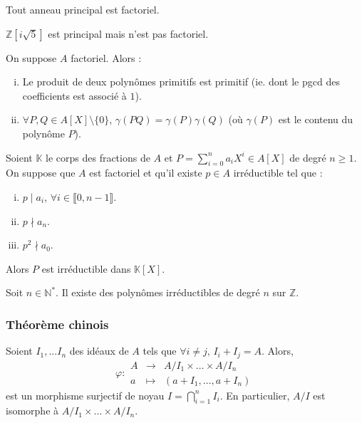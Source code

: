 	\begin{theorem}
		\label{122-4}
		Tout anneau principal est factoriel.
	\end{theorem}

	\begin{cexample}
		$\mathbb{Z}[i\sqrt{5}]$ est principal mais n'est pas factoriel.
	\end{cexample}
	
	
	\begin{lemma}[Gauss]
		On suppose $A$ factoriel. Alors :
		\begin{enumerate}[(i)]
			\item Le produit de deux polynômes primitifs est primitif (ie. dont le pgcd des coefficients est associé à $1$).
			\item $\forall P, Q \in A[X] \setminus \{ 0 \}$, $\gamma(PQ) = \gamma(P) \gamma(Q)$ (où $\gamma(P)$ est le contenu du polynôme $P$).
		\end{enumerate}
	\end{lemma}
	
	\begin{theorem}
		Soient $\mathbb{K}$ le corps des fractions de $A$ et $P = \sum_{i=0}^n a_i X^i \in A[X]$ de degré $n \geq 1$. On suppose que $A$ est factoriel et qu'il existe $p \in A$ irréductible tel que :
		\begin{enumerate}[(i)]
			\item $p \mid a_i$, $\forall i \in \llbracket 0, n-1 \rrbracket$.
			\item $p \nmid a_n$.
			\item $p^2 \nmid a_0$.
		\end{enumerate}
		Alors $P$ est irréductible dans $\mathbb{K}[X]$.
	\end{theorem}
	
	
	\begin{application}
		Soit $n \in \mathbb{N}^*$. Il existe des polynômes irréductibles de degré $n$ sur $\mathbb{Z}$.
	\end{application}
	
	\subsubsection{Théorème chinois}
	
	
	\begin{theorem}
		Soient $I_1, \dots I_n$ des idéaux de $A$ tels que $\forall i \neq j, \, I_i + I_j = A$. Alors,
		\[
			\varphi :
			\begin{array}{ccc}
				A &\rightarrow& A/I_1 \times \dots \times A/I_n \\
				a &\mapsto& (a + I_1, \dots, a + I_n)
			\end{array}
		\]
		est un morphisme surjectif de noyau $I = \bigcap_{i=1}^n I_i$. En particulier, $A/I$ est isomorphe à $A/I_1 \times \dots \times A/I_n$.
	\end{theorem}
	
